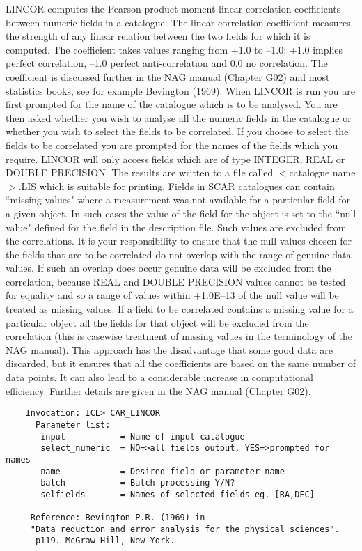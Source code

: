 LINCOR computes the Pearson product-moment linear correlation
coefficients between numeric fields in a catalogue.
The linear correlation coefficient measures the strength of any
linear relation between the two fields for which it is computed.
The coefficient takes values ranging from +1.0 to --1.0; +1.0
implies perfect correlation, --1.0 perfect anti-correlation
and 0.0 no correlation.
The coefficient is discussed further in the NAG manual (Chapter G02)
and most statistics books, see for example Bevington (1969).
When LINCOR is run you are first prompted for the name
of the catalogue which is to be analysed.
You are then asked whether you wish to analyse all the numeric fields in
the catalogue or whether you wish to select the fields to be correlated.
If you choose to select the fields to be correlated you are prompted for
the names of the fields which you require.
LINCOR will only access fields which are of type INTEGER, REAL or DOUBLE
PRECISION.
The results are written to a file called $<$catalogue name$>$.LIS which
is suitable for printing.
Fields in SCAR catalogues can contain ``missing values" where a
measurement was not available for a particular field for a given
object.
In such cases the value of the field for the object is set to the ``null
value" defined for the field in the description file.
Such values are excluded from the correlations.
It is your responsibility to ensure that the null values
chosen for the fields that are to be correlated do not overlap with
the range of genuine data values.
If such an overlap does occur genuine data will be excluded from the
correlation, because REAL and DOUBLE PRECISION values cannot be tested for
equality and so a range of values within \underline{+}1.0E--13 of the null
value will be treated as missing values.
If a field to be correlated contains a missing value for a
particular object all the fields for that object will be excluded
from the correlation (this is casewise treatment of missing values
in the terminology of the NAG manual).
This approach has the disadvantage that some good data are discarded, but
it ensures that all the coefficients are based on the same number of data
points.
It can also lead to a considerable increase in computational efficiency.
Further details are given in the NAG manual (Chapter G02).
\begin{verbatim}
    Invocation: ICL> CAR_LINCOR
      Parameter list:
       input           = Name of input catalogue
       select_numeric  = NO=>all fields output, YES=>prompted for names
       name            = Desired field or parameter name
       batch           = Batch processing Y/N?
       selfields       = Names of selected fields eg. [RA,DEC]

     Reference: Bevington P.R. (1969) in
     "Data reduction and error analysis for the physical sciences".
      p119. McGraw-Hill, New York.
\end{verbatim}

